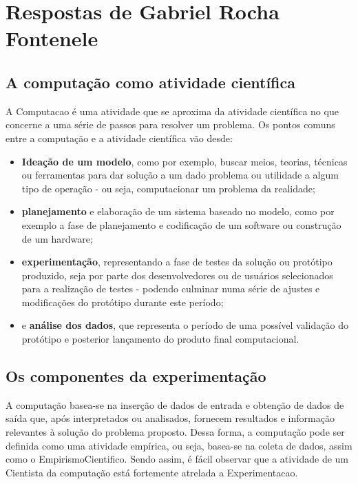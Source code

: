 \section{Respostas de Gabriel Rocha Fontenele\label{tarefa-ngsylar-componentes-experimento}}

\subsection{A computação como atividade científica}

A \gls{Computacao} é uma atividade que se aproxima da atividade científica no que concerne a uma série de passos para resolver um problema. Os pontos comuns entre a computação e a atividade científica vão desde:

\begin{itemize}
\item \textbf{Ideação de um modelo}, como por exemplo, buscar meios, teorias, técnicas ou ferramentas para dar solução a um dado problema ou utilidade a algum tipo de operação - ou seja, computacionar um problema da realidade;
\item \textbf{planejamento} e elaboração de um sistema baseado no modelo, como por exemplo a fase de planejamento e codificação de um software ou construção de um hardware;
\item \textbf{experimentação}, representando a fase de testes da solução ou protótipo produzido, seja por parte dos desenvolvedores ou de usuários selecionados para a realização de testes - podendo culminar numa série de ajustes e modificações do protótipo durante este período;
\item e \textbf{análise dos dados}, que representa o período de uma possível validação do protótipo e posterior lançamento do produto final computacional.
\end{itemize}

\subsection{Os componentes da experimentação}

A computação basea-se na inserção de dados de entrada e obtenção de dados de saída que, após interpretados ou analisados, fornecem resultados e informação relevantes à solução do problema proposto. Dessa forma, a computação pode ser definida como uma atividade empírica, ou seja, basea-se na coleta de dados, assim como o \gls{EmpirismoCientifico}. Sendo assim, é fácil observar que a atividade de um \gls{Cientista} da computação está fortemente atrelada a \gls{Experimentacao}.

